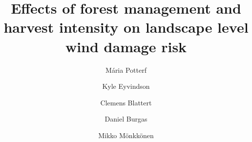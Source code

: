 \documentclass[]{elsarticle} %
\begin{document}
\begin{frontmatter}

  \title{Effects of forest management and harvest intensity on landscape level wind damage risk}
    \author[Department of Biological and Environmental Science]{Mária Potterf}
    \author[Department of Biological and Environmental Science]{Kyle Eyvindson}
    \author[Department of Biological and Environmental Science]{Clemens Blattert}
    \author[Department of Biological and Environmental Science]{Daniel Burgas}
    \author[Department of Biological and Environmental Science]{Mikko Mönkkönen}
      \address[University of Jyvaskyla]{Department of Biological and Environmental Science, University of Jyvaskyla, P.O. Box 35, FI-40014 Jyvaskyla, Finland}
    \address[Wisdom]{This is wisdom address}
    \address[LUKE]{THIS is Luke address Department, Street, City, State, Zip}
    \cortext[]{}
  

\end{frontmatter}
\end{document}
